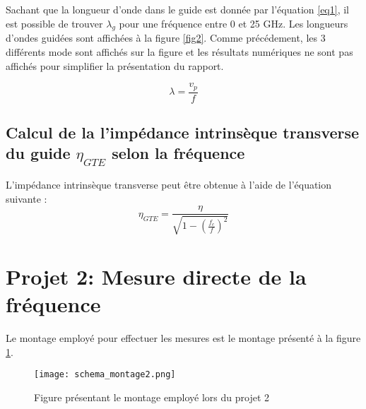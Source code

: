 Sachant que la longueur d'onde dans le guide est donnée par l'équation \ref{eq1}, il est possible de trouver $\lambda_g$ pour une fréquence entre 0 et 25 GHz. Les longueurs d'ondes guidées sont affichées à la figure \ref{fig2}. Comme précédement, les 3 différents mode sont affichés sur la figure et les résultats numériques ne sont pas affichés pour simplifier la présentation du rapport.

\begin{equation}
	\lambda = \frac{v_p}{f}
\end{equation}

\subsection{Calcul de la l'impédance intrinsèque transverse du guide $\eta_{GTE}$ selon la fréquence}
L'impédance intrinsèque transverse peut être obtenue à l'aide de l'équation suivante :
\begin{equation}
	\eta_{GTE} = \frac{\eta}{\sqrt{1-\left(\frac{f_c}{f}\right)^2}}
\end{equation}

\section{Projet 2: Mesure directe de la fréquence}
Le montage employé pour effectuer les mesures est le montage présenté à la figure \ref{f:fig4}.

\begin{figure}
\centering
\texttt{[image: schema\_montage2.png]}
\caption{Figure présentant le montage employé lors du projet 2}
\label{f:fig4}
\end{figure}

